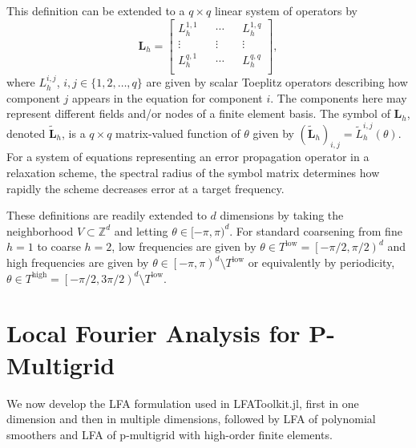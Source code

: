 \documentclass[review]{siamart190516}
\begin{document}
This definition can be extended to a $q \times q$ linear system of operators by
\begin{equation}
\mathbf{L}_h =
\begin{bmatrix}
    L_h^{1, 1} && \cdots && L_h^{1, q}        \\
    \vdots               && \vdots && \vdots  \\
    L_h^{q, 1} && \cdots && L_h^{q, q}        \\
\end{bmatrix},
\end{equation}
where $L_h^{i, j}$, $i, j \in \lbrace 1, 2, \dots, q \rbrace$ are given by scalar Toeplitz operators describing how component $j$ appears in the equation for component $i$.
The components here may represent different fields and/or nodes of a finite element basis.
The symbol of $\mathbf{L}_h$, denoted $\tilde{\mathbf{L}}_h$, is a $q \times q$ matrix-valued function of $\theta$ given by $\left( \tilde{\mathbf{L}}_h \right)_{i, j} = \tilde{L}_h^{i, j} \left( \theta \right)$.
For a system of equations representing an error propagation operator in a relaxation scheme, the spectral radius of the symbol matrix determines how rapidly the scheme decreases error at a target frequency.

These definitions are readily extended to $d$ dimensions by taking the neighborhood $V \subset \mathbb Z^d$ and letting $\theta \in [-\pi,\pi)^d$.
For standard coarsening from fine $h=1$ to coarse $h=2$, low frequencies are given by $\theta \in T^{\text{low}} = \left[ - \pi / 2, \pi / 2 \right)^d$ and high frequencies are given by $\theta \in \left[-\pi, \pi \right)^d \setminus T^{\text{low}}$ or equivalently by periodicity, $\theta \in T^{\text{high}} = \left[ - \pi / 2, 3 \pi / 2 \right)^d \setminus T^{\text{low}}$.

\section{Local Fourier Analysis for P-Multigrid}\label{sec:lfa}

We now develop the LFA formulation used in LFAToolkit.jl, first in one dimension and then in multiple dimensions, followed by LFA of polynomial smoothers and LFA of p-multigrid with high-order finite elements.

\end{document}

